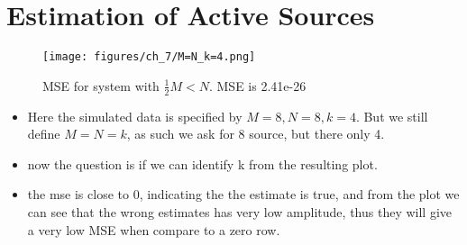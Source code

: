 \chapter{Estimation of Active Sources}
\begin{figure}[H]
    \centering
	\texttt{[image: figures/ch\_7/M=N\_k=4.png]}
	\caption{MSE for system with $\frac{1}{2} M<N$. MSE is 2.41e-26}
	\label{fig:M=N_k=4}
\end{figure}  
\begin{itemize}
\item Here the simulated data is specified by $M=8,N=8,k=4$. But we still define $M=N=k$, as such we ask for 8 source, but there only 4. 
\item now the question is if we can identify k from the resulting plot.  
\item the mse is close to 0, indicating the the estimate is true, and from the plot we can see that the wrong estimates has very low amplitude, thus they will give a very low MSE when compare to a zero row.
\end{itemize}


